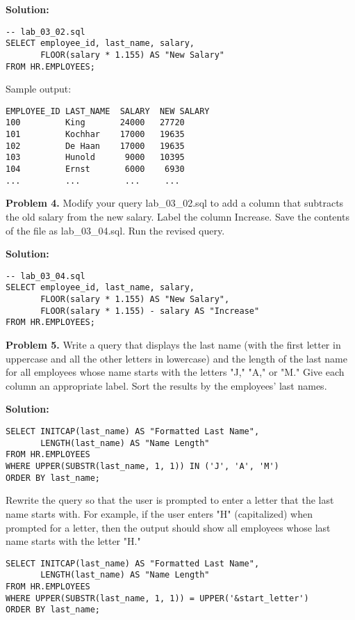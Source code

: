 \documentclass[12pt,a4paper]{article}
\begin{document}
\textbf{Solution:}
\begin{lstlisting}[style=sqlstyle]
-- lab_03_02.sql
SELECT employee_id, last_name, salary,
       FLOOR(salary * 1.155) AS "New Salary"
FROM HR.EMPLOYEES;
\end{lstlisting}

Sample output:
\begin{verbatim}
EMPLOYEE_ID LAST_NAME  SALARY  NEW SALARY
100         King       24000   27720
101         Kochhar    17000   19635
102         De Haan    17000   19635
103         Hunold      9000   10395
104         Ernst       6000    6930
...         ...         ...     ...
\end{verbatim}

\textbf{Problem 4.} Modify your query lab\_03\_02.sql to add a column that subtracts the old salary from the new salary. Label the column Increase. Save the contents of the file as lab\_03\_04.sql. Run the revised query.

\textbf{Solution:}
\begin{lstlisting}[style=sqlstyle]
-- lab_03_04.sql
SELECT employee_id, last_name, salary,
       FLOOR(salary * 1.155) AS "New Salary",
       FLOOR(salary * 1.155) - salary AS "Increase"
FROM HR.EMPLOYEES;
\end{lstlisting}

\textbf{Problem 5.} Write a query that displays the last name (with the first letter in uppercase and all the other letters in lowercase) and the length of the last name for all employees whose name starts with the letters "J," "A," or "M." Give each column an appropriate label. Sort the results by the employees' last names.

\textbf{Solution:}
\begin{lstlisting}[style=sqlstyle]
SELECT INITCAP(last_name) AS "Formatted Last Name",
       LENGTH(last_name) AS "Name Length"
FROM HR.EMPLOYEES
WHERE UPPER(SUBSTR(last_name, 1, 1)) IN ('J', 'A', 'M')
ORDER BY last_name;
\end{lstlisting}

Rewrite the query so that the user is prompted to enter a letter that the last name starts with. For example, if the user enters "H" (capitalized) when prompted for a letter, then the output should show all employees whose last name starts with the letter "H."

\begin{lstlisting}[style=sqlstyle]
SELECT INITCAP(last_name) AS "Formatted Last Name",
       LENGTH(last_name) AS "Name Length"
FROM HR.EMPLOYEES
WHERE UPPER(SUBSTR(last_name, 1, 1)) = UPPER('&start_letter')
ORDER BY last_name;
\end{lstlisting}
\end{document}

